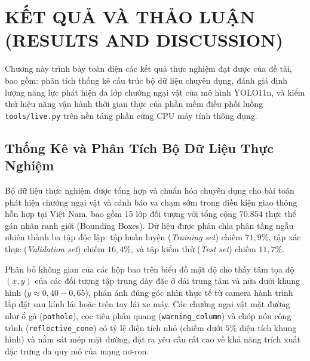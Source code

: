 
\section{KẾT QUẢ VÀ THẢO LUẬN (RESULTS AND DISCUSSION)}
\label{sec:ket_qua_va_thao_luan}

Chương này trình bày toàn diện các kết quả thực nghiệm đạt được của đề tài, bao gồm: phân tích thống kê cấu trúc bộ dữ liệu chuyên dụng, đánh giá định lượng năng lực phát hiện đa lớp chướng ngại vật của mô hình YOLO11n, và kiểm thử hiệu năng vận hành thời gian thực của phần mềm điều phối luồng \texttt{tools/live.py} trên nền tảng phần cứng CPU máy tính thông dụng.

\subsection{Thống Kê và Phân Tích Bộ Dữ Liệu Thực Nghiệm}
\label{subsec:thong_ke_bo_du_lieu}

Bộ dữ liệu thực nghiệm được tổng hợp và chuẩn hóa chuyên dụng cho bài toán phát hiện chướng ngại vật và cảnh báo va chạm sớm trong điều kiện giao thông hỗn hợp tại Việt Nam, bao gồm 15 lớp đối tượng với tổng cộng $70.854$ thực thể gán nhãn ranh giới (Bounding Boxes). Dữ liệu được phân chia phân tầng ngẫu nhiên thành ba tập độc lập: tập huấn luyện (\textit{Training set}) chiếm $71,9\%$, tập xác thực (\textit{Validation set}) chiếm $16,4\%$, và tập kiểm thử (\textit{Test set}) chiếm $11,7\%$.

Phân bố không gian của các hộp bao trên biểu đồ mật độ cho thấy tâm tọa độ $(x, y)$ của các đối tượng tập trung dày đặc ở dải trung tâm và nửa dưới khung hình ($y \approx 0,40 - 0,65$), phản ánh đúng góc nhìn thực tế từ camera hành trình lắp đặt sau kính lái hoặc trên tay lái xe máy. Các chướng ngại vật mặt đường như ổ gà (\texttt{pothole}), cọc tiêu phản quang (\texttt{warning\_column}) và chóp nón công trình (\texttt{reflective\_cone}) có tỷ lệ diện tích nhỏ (chiếm dưới $5\%$ diện tích khung hình) và nằm sát mép mặt đường, đặt ra yêu cầu rất cao về khả năng trích xuất đặc trưng đa quy mô của mạng nơ-ron.

